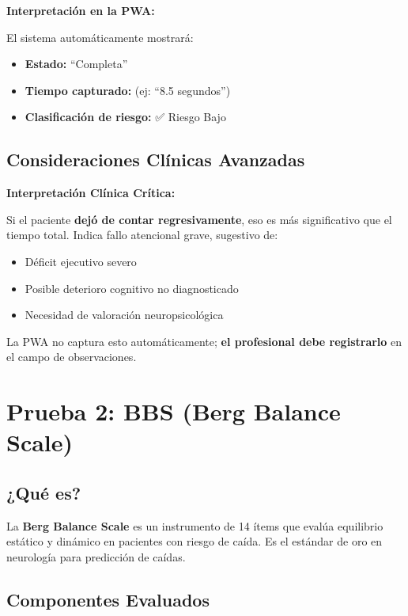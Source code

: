 \documentclass[12pt,a4paper,spanish,oneside]{book}
\begin{document}
\textbf{Interpretación en la PWA:}

El sistema automáticamente mostrará:
\begin{itemize}
  \item \textbf{Estado:} ``Completa''
  \item \textbf{Tiempo capturado:} (ej: ``8.5 segundos'')
  \item \textbf{Clasificación de riesgo:} ✅ Riesgo Bajo
\end{itemize}

\subsection{Consideraciones Clínicas Avanzadas}

\begin{advertenciabox}
  \textbf{Interpretación Clínica Crítica:}
  
  Si el paciente \textbf{dejó de contar regresivamente}, eso es más significativo que el tiempo total. Indica fallo atencional grave, sugestivo de:
  \begin{itemize}
    \item Déficit ejecutivo severo
    \item Posible deterioro cognitivo no diagnosticado
    \item Necesidad de valoración neuropsicológica
  \end{itemize}
  
  La PWA no captura esto automáticamente; \textbf{el profesional debe registrarlo} en el campo de observaciones.
\end{advertenciabox}

\section{Prueba 2: BBS (Berg Balance Scale)}

\subsection{¿Qué es?}

La \textbf{Berg Balance Scale} es un instrumento de 14 ítems que evalúa equilibrio estático y dinámico en pacientes con riesgo de caída. Es el estándar de oro en neurología para predicción de caídas.

\subsection{Componentes Evaluados}
\end{document}

